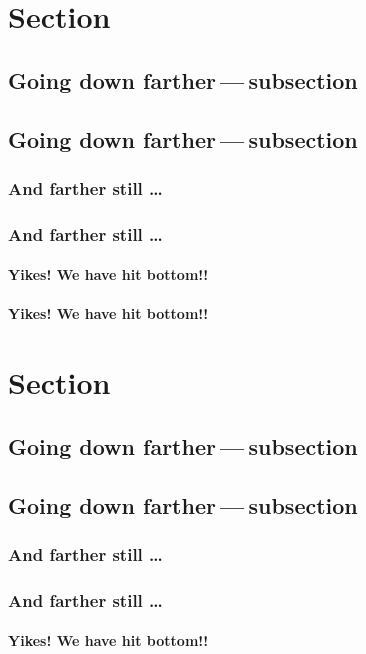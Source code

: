 \section*{Section}
\hypertarget{_section}{\subsection*{Going down farther — subsection}}
\subsection*{Going down farther — subsection}
\hypertarget{_going_down_farther — subsection}{\subsubsection*{And farther still …​}}
\subsubsection*{And farther still …​}
\hypertarget{_and_farther_still_…​}{\paragraph*{Yikes! We have hit bottom!!}}
\paragraph*{Yikes! We have hit bottom!!}
\hypertarget{_yikes!_we_have_hit_bottom!!}{}
\section{Section}
\hypertarget{_section}{\subsection{Going down farther — subsection}}
\subsection{Going down farther — subsection}
\hypertarget{_going_down_farther — subsection}{\subsubsection{And farther still …​}}
\subsubsection{And farther still …​}
\hypertarget{_and_farther_still_…​}{\paragraph{Yikes! We have hit bottom!!}}
